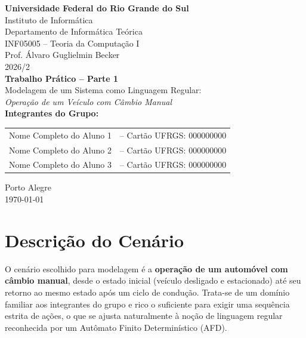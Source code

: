\documentclass[12pt,a4paper]{article}
\title{}
\author{}
\date{}
\begin{document}
\begin{titlepage}
    \begin{center}
        \vspace*{1cm}
        \Large\textbf{Universidade Federal do Rio Grande do Sul}\\[0.2cm]
        \large Instituto de Informática\\
        \large Departamento de Informática Teórica\\[0.4cm]
        \large INF05005 -- Teoria da Computação I\\
        \large Prof. Álvaro Guglielmin Becker\\
        \large 2026/2\\[3cm]

        \Huge\textbf{Trabalho Prático -- Parte 1}\\[0.5cm]
        \LARGE Modelagem de um Sistema como Linguagem Regular:\\
        \Large \textit{Operação de um Veículo com Câmbio Manual}\\[4cm]

        \Large\textbf{Integrantes do Grupo:}\\[0.5cm]
        \large
        \begin{tabular}{ll}
            Nome Completo do Aluno 1 & -- Cartão UFRGS: 000000000 \\
            Nome Completo do Aluno 2 & -- Cartão UFRGS: 000000000 \\
            Nome Completo do Aluno 3 & -- Cartão UFRGS: 000000000 \\
        \end{tabular}

        \vfill
        \large Porto Alegre\\
        \large \today
    \end{center}
\end{titlepage}

\tableofcontents
\newpage

\section{Descrição do Cenário}

O cenário escolhido para modelagem é a \textbf{operação de um automóvel com câmbio manual}, desde o estado inicial (veículo desligado e estacionado) até seu retorno ao mesmo estado após um ciclo de condução. Trata-se de um domínio familiar aos integrantes do grupo e rico o suficiente para exigir uma sequência estrita de ações, o que se ajusta naturalmente à noção de linguagem regular reconhecida por um Autômato Finito Determinístico (AFD).
\end{document}
